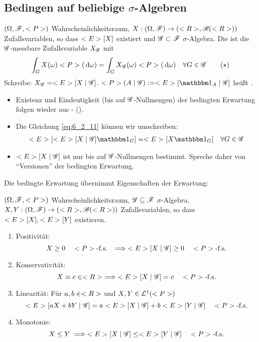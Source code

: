 \subsection*{Bedingen auf beliebige $\sigma$-Algebren} %
\begin{definition}
	$(\Omega, \mathscr F, <P>)$ Wahrscheinlichkeitsraum, $X: (\Omega, \mathscr F) \to (<R>, \mathscr{B}(<R>))$ Zufallsvariablen, so dass $<E>[X]$ existiert und $\mathscr{G} \subset \mathscr F$ $\sigma$-Algebra. Die  ist die $\mathscr{G}$-messbare Zufallsvariable $X_{\mathscr{G}}$ mit
	\begin{align*}
		\int_G X(\omega)<P>(\,\mathrm{d} \omega) = \int_G X_{\mathscr{G}}(\omega)<P>(\,\mathrm{d} \omega) \quad \forall G \in \mathscr{G} \label{eq:6_2_11}\tag{$\star$}
	\end{align*}
	Schreibe: $X_{\mathscr{G}} = <E>[X \mid \mathscr{G}]$. $\P(A \mid \G) := \E[\indi_A \mid \G]$ heißt .
\end{definition}
\begin{*remark}
	\begin{itemize}
		\item Existenz und Eindeutigkeit (bis auf $\mathscr{G}$-Nullmengen) der bedingten Erwartung folgen wieder aus - ().
		\item Die Gleichung \eqref{eq:6_2_11} können wir umschreiben:
		\begin{align*}
			\E[\E[X \mid \G]\indi_G] = \E[X \indi_G] \quad \forall G \in \G
		\end{align*}
		\item $<E>[X \mid \mathscr{G}]$ ist nur bis auf $\mathscr{G}$-Nullmengen bestimmt.  Spreche daher von ``Versionen'' der bedingten Erwartung.
	\end{itemize}
\end{*remark}
Die bedingte Erwartung übernimmt Eigenschaften der Erwartung:
\begin{lemma}
	$(\Omega,\mathscr F, <P>)$ Wahrscheinlichkeitsraum, $\mathscr{G} \subseteq \mathscr F$ $\sigma$-Algebra, $X,Y: (\Omega, \mathscr F) \to (<R>, \mathscr{B}(<R>))$ Zufallsvariablen, so dass $<E>[X],<E>[Y]$ existieren.
	\begin{enumerate}
		\item Positivität:
		\[
			X \ge 0 \quad <P>\text{-f.s. } \implies <E>[X\mid \mathscr{G}] \ge 0\quad <P>\text{-f.s.}
		\]
		\item Konservativität:
		\[
			X \equiv c \in <R> \implies <E>[X \mid \mathscr{G}] = c \quad <P>\text{-f.s.}
		\]
		\item Linearität: Für $a,b \in <R>$ und $X,Y \in \mathcal{L}^{1}(<P>)$
		\[
			<E>[aX + bY \mid \mathscr{G}] = a<E>[X \mid \mathscr{G}] + b <E>[Y \mid \mathscr{G}] \quad <P>\text{-f.s.}
		\]
		\item Monotonie:
		\[
			X \le Y \implies <E>[X \mid \mathscr{G}] \le <E>[Y \mid \mathscr{G}] \quad <P>\text{-f.s.}
		\]
	\end{enumerate}
\end{lemma}
